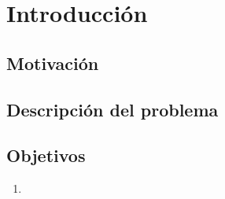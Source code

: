\chapter{Introducción}

\section{Motivación}

\section{Descripción del problema}

\section{Objetivos}
\begin{enumerate} 
    \item 
\end{enumerate}
